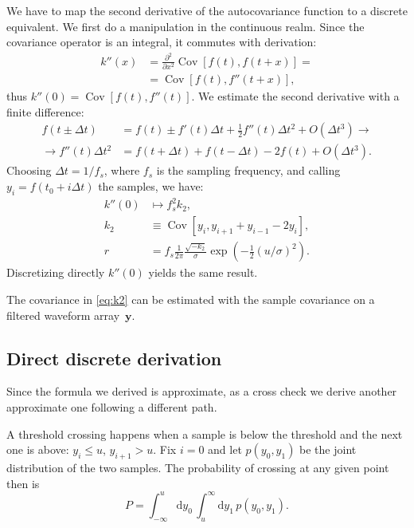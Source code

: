 We have to map the second derivative of the autocovariance function to a
discrete equivalent. We first do a manipulation in the continuous realm. Since
the covariance operator is an integral, it commutes with derivation:
%
\begin{align}
    k''(x)
    &= \frac{\partial^2}{\partial x^2} \operatorname{Cov}[f(t), f(t+x)] = \\
    &= \operatorname{Cov}[f(t), f''(t+x)],
\end{align}
%
thus $k''(0) = \operatorname{Cov}[f(t), f''(t)]$. We estimate the second
derivative with a finite difference:
%
\begin{align}
    f(t \pm \Delta t)
    &= f(t) \pm f'(t) \Delta t + \frac12 f''(t) \Delta t^2 + O(\Delta t^3)
    \rightarrow \\
    \rightarrow f''(t) \Delta t^2 &=
    f(t + \Delta t) + f(t - \Delta t) - 2 f(t) + O(\Delta t^3).
\end{align}
%
Choosing $\Delta t = 1/f_s$, where $f_s$ is the sampling frequency, and calling
$y_i = f(t_0 + i\Delta t)$ the samples, we have:
\begin{align}
    k''(0) &\mapsto f_s^2 k_2, \\
    k_2 &\equiv \operatorname{Cov}[y_i, y_{i+1}+y_{i-1}-2y_i], \label{eq:k2} \\
    r &= f_s \frac 1 {2\pi} \frac {\sqrt{-k_2}} \sigma
         \exp \left( -\frac12 (u/\sigma)^2 \right).
    \label{eq:rcont}
\end{align}
%
Discretizing directly $k''(0)$ yields the same result.

The covariance in \autoref{eq:k2} can be estimated with the sample
covariance on a filtered waveform array~$\mathbf y$.

\subsection{Direct discrete derivation}

Since the formula we derived is approximate, as a cross check we derive another
approximate one following a different path.

A threshold crossing happens when a sample is below the threshold and the next
one is above: $y_i \leq u$, $y_{i+1} > u$. Fix $i=0$ and let $p(y_0,y_1)$ be the
joint distribution of the two samples. The probability of crossing at any given
point then is
%
\begin{equation}
    P =
    \int_{-\infty}^u \mathrm d y_0\,
    \int_u^\infty \mathrm d y_1\,
    p(y_0, y_1).
    \label{eq:crossingprob}
\end{equation}

